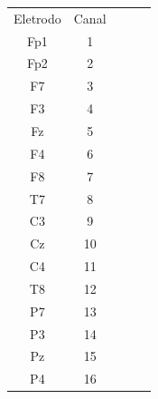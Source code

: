 \documentclass[
	12pt,				%
	openright,			%
	twoside,			%
	a4paper,			%
	english,			%
	french,				%
	spanish,			%
	brazil				%
	]{abntex2}
\begin{document}
\begin{table}[h]
\begin{tabular}{cclll}
Eletrodo                  & Canal                   &                      &                      &  \\ \cline{1-2}
\multicolumn{1}{|c|}{Fp1} & \multicolumn{1}{c|}{1}  & \multicolumn{1}{c}{} & \multicolumn{1}{c}{} &  \\ \cline{1-2}
\multicolumn{1}{|c|}{Fp2} & \multicolumn{1}{c|}{2}  & \multicolumn{1}{c}{} & \multicolumn{1}{c}{} &  \\ \cline{1-2}
\multicolumn{1}{|c|}{F7}  & \multicolumn{1}{c|}{3}  & \multicolumn{1}{c}{} & \multicolumn{1}{c}{} &  \\ \cline{1-2}
\multicolumn{1}{|c|}{F3}  & \multicolumn{1}{c|}{4}  & \multicolumn{1}{c}{} & \multicolumn{1}{c}{} &  \\ \cline{1-2}
\multicolumn{1}{|c|}{Fz}  & \multicolumn{1}{c|}{5}  &                      &                      &  \\ \cline{1-2}
\multicolumn{1}{|c|}{F4}  & \multicolumn{1}{c|}{6}  &                      &                      &  \\ \cline{1-2}
\multicolumn{1}{|c|}{F8}  & \multicolumn{1}{c|}{7}  &                      &                      &  \\ \cline{1-2}
\multicolumn{1}{|c|}{T7}  & \multicolumn{1}{c|}{8}  &                      &                      &  \\ \cline{1-2}
\multicolumn{1}{|c|}{C3}  & \multicolumn{1}{c|}{9}  &                      &                      &  \\ \cline{1-2}
\multicolumn{1}{|c|}{Cz}  & \multicolumn{1}{c|}{10} &                      &                      &  \\ \cline{1-2}
\multicolumn{1}{|c|}{C4}  & \multicolumn{1}{c|}{11} &                      &                      &  \\ \cline{1-2}
\multicolumn{1}{|c|}{T8}  & \multicolumn{1}{c|}{12} &                      &                      &  \\ \cline{1-2}
\multicolumn{1}{|c|}{P7}  & \multicolumn{1}{c|}{13} &                      &                      &  \\ \cline{1-2}
\multicolumn{1}{|c|}{P3}  & \multicolumn{1}{c|}{14} &                      &                      &  \\ \cline{1-2}
\multicolumn{1}{|c|}{Pz}  & \multicolumn{1}{c|}{15} &                      &                      &  \\ \cline{1-2}
\multicolumn{1}{|c|}{P4}  & \multicolumn{1}{c|}{16} &                      &                      &  \\ \cline{1-2}

\end{tabular}
\end{table}
\end{document}
